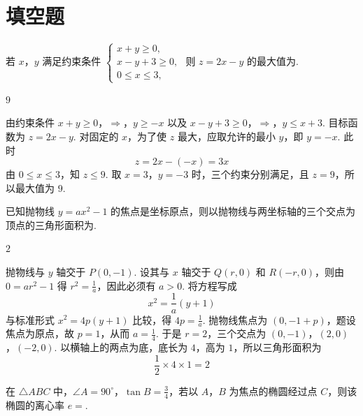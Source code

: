 \section{填空题}

\begin{problem}
若 \(x\)，\(y\) 满足约束条件 \(\begin{cases}
x + y \geqslant 0,\\
x - y + 3 \geqslant 0,\\
0 \leqslant x \leqslant 3,
\end{cases}\) 则 \(z = 2x - y\) 的最大值为\fillinblank{}.
\end{problem}

\begin{answer}
\(9\)
\end{answer}

\begin{solution}
由约束条件
\(x+y\geqslant0\)，\(\Longrightarrow\)，\(y\geqslant-x\)
以及
\(x-y+3\geqslant0\)，\(\Longrightarrow\)，\(y\leqslant x+3\).
目标函数为 \(z=2x-y\). 对固定的 \(x\)，为了使 \(z\) 最大，应取允许的最小 \(y\)，即 \(y=-x\). 此时
\[
z=2x-(-x)=3x
\]
由 \(0\leqslant x\leqslant3\)，知 \(z\leqslant9\). 取 \(x=3\)，\(y=-3\) 时，三个约束分别满足，且 \(z=9\)，所以最大值为 \(9\).
\end{solution}

\begin{problem}
已知抛物线 \( y = ax^2 - 1 \) 的焦点是坐标原点，则以抛物线与两坐标轴的三个交点为顶点的三角形面积为\fillinblank{}.
\end{problem}

\begin{answer}
\(2\)
\end{answer}

\begin{solution}
抛物线与 \(y\) 轴交于 \(P(0,-1)\). 设其与 \(x\) 轴交于 \(Q(r,0)\) 和 \(R(-r,0)\)，则由 \(0=ar^2-1\) 得 \(r^2=\frac1a\)，因此必须有 \(a>0\).
将方程写成
\[
x^2=\frac1a(y+1)
\]
与标准形式 \(x^2=4p(y+1)\) 比较，得 \(4p=\frac1a\). 抛物线焦点为 \((0,-1+p)\)，题设焦点为原点，故 \(p=1\)，从而 \(a=\frac14\).
于是 \(r=2\)，三个交点为 \((0,-1)\)，\((2,0)\)，\((-2,0)\). 以横轴上的两点为底，底长为 \(4\)，高为 \(1\)，所以三角形面积为
\[
\frac12\times4\times1=2
\]
\end{solution}

\begin{problem}
在 \(\triangle ABC\) 中，\(\angle A = 90^{\circ}\)，\(\tan B = \frac{3}{4}\)，若以 \(A\)，\(B\) 为焦点的椭圆经过点 \(C\)，则该椭圆的离心率 \(e = \)\fillinblank{}.
\end{problem}

